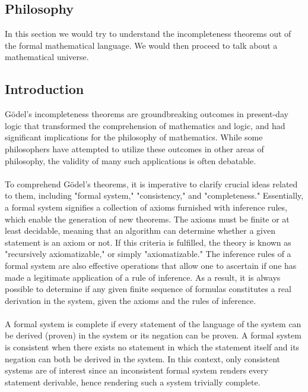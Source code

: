 \documentclass[10pt,a4paper]{article}
\newcounter{theo}
\begin{document}
                \subsection{Philosophy}
                        In this section we would try to understand the incompleteness theorems out of the formal mathematical language. We would then proceed to talk about a mathematical universe.
                        \subsection{Introduction}
                            Gödel's incompleteness theorems are groundbreaking outcomes in present-day logic that transformed the comprehension of mathematics and logic, and had significant implications for the philosophy of mathematics. While some philosophers have attempted to utilize these outcomes in other areas of philosophy, the validity of many such applications is often debatable.
                            \\
                            \\
                            To comprehend Gödel's theorems, it is imperative to clarify crucial ideas related to them, including "formal system," "consistency," and "completeness." Essentially, a formal system signifies a collection of axioms furnished with inference rules, which enable the generation of new theorems. The axioms must be finite or at least decidable, meaning that an algorithm can determine whether a given statement is an axiom or not. If this criteria is fulfilled, the theory is known as "recursively axiomatizable," or simply "axiomatizable." The inference rules of a formal system are also effective operations that allow one to ascertain if one has made a legitimate application of a rule of inference. As a result, it is always possible to determine if any given finite sequence of formulas constitutes a real derivation in the system, given the axioms and the rules of inference.
                            \\
                            \\
                            A formal system is complete if every statement of the language of the system can be derived (proven) in the system or its negation can be proven. A formal system is consistent when there exists no statement in which the statement itself and its negation can both be derived in the system. In this context, only consistent systems are of interest since an inconsistent formal system renders every statement derivable, hence rendering such a system trivially complete.
\end{document}

